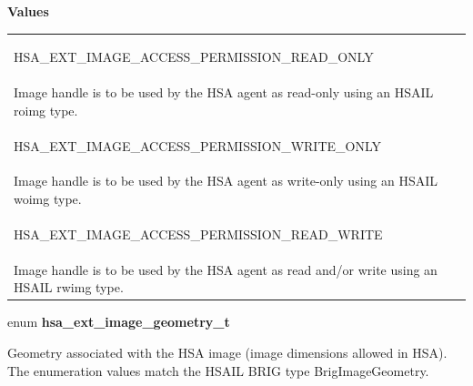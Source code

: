 \documentclass[final]{book}
\newcommand{\reftyp}[1]{#1}
\newcommand{\refenu}[1]{\reftyp{#1}}
\begin{document}
\noindent\textbf{Values}\\[-5mm]
\begin{longtable}{@{\hspace{2em}}p{\linewidth-2em}}
\hspace{-2em}\hypertarget{group__images_1ggab659478436fb8b92eae3ffe55f09e913a71094ed618e4e51e26a7f8c19e1fcaf3}{\refenu{HSA_EXT_IMAGE_ACCESS_PERMISSION_READ_ONLY}} \\Image handle is to be used by the HSA agent as read-only using an HSAIL roimg type.\\[2mm]
\hspace{-2em}\hypertarget{group__images_1ggab659478436fb8b92eae3ffe55f09e913a92d8fe67219c916c4afd249d9a957642}{\refenu{HSA_EXT_IMAGE_ACCESS_PERMISSION_WRITE_ONLY}} \\Image handle is to be used by the HSA agent as write-only using an HSAIL woimg type.\\[2mm]
\hspace{-2em}\hypertarget{group__images_1ggab659478436fb8b92eae3ffe55f09e913ae4f22cb73c17d46bf667e762f102ccf5}{\refenu{HSA_EXT_IMAGE_ACCESS_PERMISSION_READ_WRITE}} \\Image handle is to be used by the HSA agent as read and/or write using an HSAIL rwimg type.
\end{longtable}

\noindent\begin{tcolorbox}[breakable,nobeforeafter,arc=0mm,colframe=white,colback=lightgray,left=0mm]
enum \hypertarget{group__images_1gac61587d98a80d1660378e3904a66fc9c}{\textbf{hsa_ext_image_geometry_t}}
\end{tcolorbox}
Geometry associated with the HSA image (image dimensions allowed in HSA). The enumeration values match the HSAIL BRIG type BrigImageGeometry.
\end{document}
